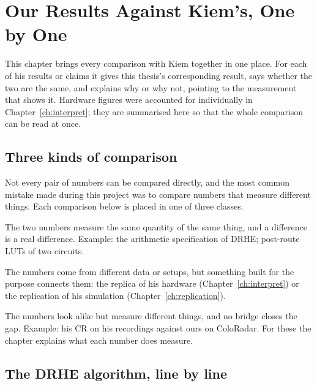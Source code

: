 \chapter{Our Results Against Kiem's, One by One}
\label{ch:kiemcompare}

This chapter brings every comparison with Kiem together in one place. For each
of his results or claims it gives this thesis's corresponding result, says
whether the two are the same, and explains why or why not, pointing to the
measurement that shows it. Hardware figures were accounted for individually in
Chapter~\ref{ch:interpret}; they are summarised here so that the whole
comparison can be read at once.

\section{Three kinds of comparison}
\label{sec:kc_kinds}

Not every pair of numbers can be compared directly, and the most common
mistake made during this project was to compare numbers that measure different
things. Each comparison below is placed in one of three classes.

\begin{description}[leftmargin=!,labelwidth=30mm,style=nextline,font=\normalfont\bfseries]
\item[Like for like] The two numbers measure the same quantity of the same
thing, and a difference is a real difference. Example: the arithmetic
specification of DRHE; post-route LUTs of two circuits.
\item[Through a bridge] The numbers come from different data or setups, but
something built for the purpose connects them: the replica of his hardware
(Chapter~\ref{ch:interpret}) or the replication of his simulation
(Chapter~\ref{ch:replication}).
\item[Not comparable] The numbers look alike but measure different things,
and no bridge closes the gap. Example: his CR on his recordings against ours on
ColoRadar. For these the chapter explains what each number does measure.
\end{description}

\section{The DRHE algorithm, line by line}
\label{sec:kc_audit}

